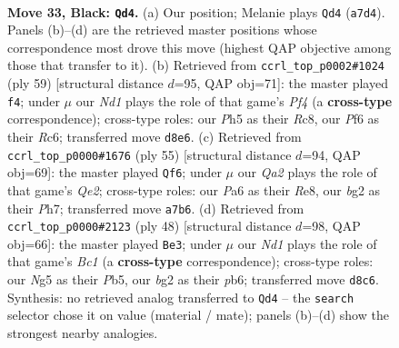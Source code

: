 \documentclass[11pt]{article}
\begin{document}
\clearpage

\begin{figure}[p]\centering
\begin{subfigure}{0.46\textwidth}\centering
\resizebox{\linewidth}{!}{%
\newchessgame
\chessboard[
  setfen={r2nk3/qp4p1/p4pN1/3Q2np/8/4P1P1/PP2RPBP/3R2K1 b - - 3 33},
  showmover=false,
  pgfstyle=straightmove, color=movearrow, markmove={a7-d4}
]}
\caption{}
\end{subfigure}\hfill
\begin{subfigure}{0.46\textwidth}\centering
\resizebox{\linewidth}{!}{%
\newchessgame
\chessboard[
  setfen={2r3k1/pq4p1/2rp4/3nppQ1/P7/1P3P2/2PB1RPP/4R1K1 b - - 4 30},
  showmover=false,
  pgfstyle=straightmove, color=movearrow, markmove={f5-f4}
]}
\caption{}
\end{subfigure}
\\[4pt]
\begin{subfigure}{0.46\textwidth}\centering
\resizebox{\linewidth}{!}{%
\newchessgame
\chessboard[
  setfen={4r3/2k1q2p/1pp3p1/p1n1p2P/8/P3QPP1/1PP5/2KB3R b - - 0 28},
  showmover=false,
  pgfstyle=straightmove, color=movearrow, markmove={e7-f6}
]}
\caption{}
\end{subfigure}\hfill
\begin{subfigure}{0.46\textwidth}\centering
\resizebox{\linewidth}{!}{%
\newchessgame
\chessboard[
  setfen={5rk1/pn3ppp/1pNbp3/1Pq5/P7/8/4QPPP/2B1R1K1 w - - 1 25},
  showmover=false,
  pgfstyle=straightmove, color=movearrow, markmove={c1-e3}
]}
\caption{}
\end{subfigure}
\caption{\textbf{Move 33, Black: \texttt{Qd4}.} (a) Our position; Melanie plays \texttt{Qd4} (\texttt{a7d4}). Panels (b)--(d) are the retrieved master positions whose correspondence most drove this move (highest QAP objective among those that transfer to it). (b) Retrieved from \texttt{ccrl\_top\_p0002\#1024} (ply 59) [structural distance $d$=95, QAP obj=71]: the master played \texttt{f4}; under $\mu$ our \emph{Nd1} plays the role of that game's \emph{Pf4} (a \textbf{cross-type} correspondence); cross-type roles: our \emph{P}h5 as their \emph{R}c8, our \emph{P}f6 as their \emph{R}c6; transferred move \texttt{d8e6}. (c) Retrieved from \texttt{ccrl\_top\_p0000\#1676} (ply 55) [structural distance $d$=94, QAP obj=69]: the master played \texttt{Qf6}; under $\mu$ our \emph{Qa2} plays the role of that game's \emph{Qe2}; cross-type roles: our \emph{P}a6 as their \emph{R}e8, our \emph{b}g2 as their \emph{P}h7; transferred move \texttt{a7b6}. (d) Retrieved from \texttt{ccrl\_top\_p0000\#2123} (ply 48) [structural distance $d$=98, QAP obj=66]: the master played \texttt{Be3}; under $\mu$ our \emph{Nd1} plays the role of that game's \emph{Bc1} (a \textbf{cross-type} correspondence); cross-type roles: our \emph{N}g5 as their \emph{P}b5, our \emph{b}g2 as their \emph{p}b6; transferred move \texttt{d8c6}. Synthesis: no retrieved analog transferred to \texttt{Qd4} -- the \texttt{search} selector chose it on value (material / mate); panels (b)--(d) show the strongest nearby analogies.}
\label{fig:thought-m65}
\end{figure}
\end{document}
